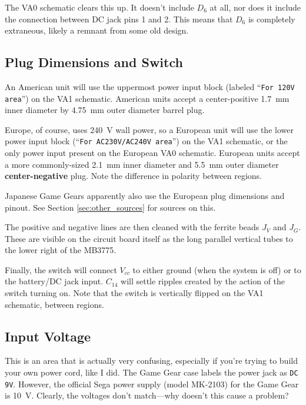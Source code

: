 \documentclass{article}
\newcommand{\Vcc}{$V_{cc}$}
\newcommand{\model}{\textsf}
\begin{document}
The \model{VA0} schematic clears this up. It doesn't include $D_6$ at
all, nor does it include the connection between DC jack pins 1 and
2. This means that $D_6$ is completely extraneous, likely a remnant
from some old design.

\subsection{Plug Dimensions and Switch}
\label{sec:plug_dimensions}
An American unit will use the uppermost power input block (labeled
``\texttt{For 120V area}'') on the \model{VA1} schematic. American
units accept a center-positive \qty{1.7}{\milli\meter} inner diameter
by \qty{4.75}{\milli\meter} outer diameter barrel plug.

Europe, of course, uses \qty{240}{\volt} wall power, so a European
unit will use the lower power input block (``\texttt{For AC230V/AC240V
  area}'') on the \model{VA1} schematic, or the only power input
present on the European \model{VA0} schematic. European units accept a
more commonly-sized \qty{2.1}{\milli\meter} inner diameter and
\qty{5.5}{\milli\meter} outer diameter \textbf{center-negative}
plug. Note the difference in polarity between regions.

Japanese Game Gears apparently also use the European plug dimensions
and pinout. See Section \ref{sec:other_sources} for sources on this.

The positive and negative lines are then cleaned with the ferrite
beads $J_V$ and $J_G$. These are visible on the circuit board itself
as the long parallel vertical tubes to the lower right of the
\model{MB3775}.

Finally, the switch will connect \Vcc{} to either ground (when the
system is off) or to the battery/DC jack input. $C_{14}$ will settle
ripples created by the action of the switch turning on. Note that the
switch is vertically flipped on the \model{VA1} schematic, between
regions.

\subsection{Input Voltage}
This is an area that is actually very confusing, especially if you're
trying to build your own power cord, like I did. The Game Gear case
labels the power jack as \texttt{DC 9V}. However, the official Sega
power supply (model \model{MK-2103}) for the Game Gear is
\qty{10}{\volt}. Clearly, the voltages don't match---why doesn't this
cause a problem?
\end{document}
